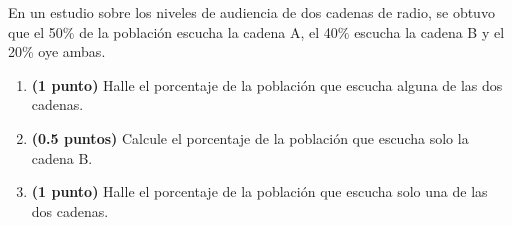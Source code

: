 
En un estudio sobre los niveles de audiencia de dos cadenas de radio, se obtuvo que el 50\% de la población escucha la cadena A, el 40\% escucha la cadena B y el 20\% oye ambas.
\begin{enumerate}[label=\alph*)]
\item \textbf{(1 punto)} Halle el porcentaje de la población que escucha alguna de las dos cadenas.
\item \textbf{(0.5 puntos)} Calcule el porcentaje de la población que escucha solo la cadena B.
\item \textbf{(1 punto)} Halle el porcentaje de la población que escucha solo una de las dos cadenas.
\end{enumerate}
